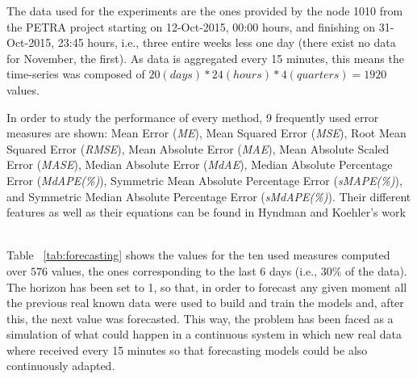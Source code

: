 The data used for the experiments are the ones provided by the node 1010 from the PETRA project starting on 12-Oct-2015, 00:00 hours, and finishing on 31-Oct-2015, 23:45 hours, i.e., three entire weeks less one day (there exist no data for November, the first). As data is aggregated every 15 minutes, this means the time-series was composed of $20(days)*24(hours)*4(quarters)=1920$ values.

In order to study the performance of every method, 9 frequently used error measures are shown:
Mean Error ({\em ME}),
 Mean Squared Error ({\em MSE}),
 Root Mean Squared Error ({\em RMSE}),
 Mean Absolute Error ({\em MAE}),
 Mean Absolute Scaled Error ({\em MASE}),
 Median Absolute Error ({\em MdAE}),
 Median Absolute Percentage Error ({\em MdAPE(\%)}),
 Symmetric Mean Absolute Percentage Error ({\em sMAPE(\%)}), and
 Symmetric Median Absolute Percentage Error ({\em sMdAPE(\%)}).
Their different features as well as their equations can be found in Hyndman and Koehler's work ~\cite{RePEc:eee:intfor:v:22:y:2006:i:4:p:679-688}

Table ~\ref{tab:forecasting} shows the values for the ten used measures computed over $576$ values, the ones corresponding to the last 6 days (i.e., $30\%$ of the data). The horizon has been set to 1, so that, in order to forecast any given moment all the previous real known data were used to build and train the models and, after this, the next value was forecasted. This way, the problem has been faced as a simulation of what could happen in a continuous system in which new real data where received every 15 minutes so that forecasting models could be also continuously adapted.

